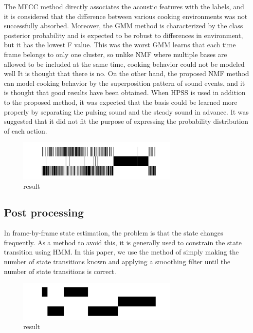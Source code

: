\documentclass[sigchi]{acmart}
\begin{document}
The MFCC method directly associates the acoustic features with the labels, and it is considered that the difference between various cooking environments was not successfully absorbed.
Moreover, the GMM method is characterized by the class posterior probability and is expected to be robust to differences in environment, but it has the lowest F value. This was the worst%
GMM learns that each time frame belongs to only one cluster, so unlike NMF where multiple bases are allowed to be included at the same time, cooking behavior could not be modeled well It is thought that there is no.
On the other hand, the proposed NMF method can model cooking behavior by the superposition pattern of sound events, and it is thought that good results have been obtained.
When HPSS is used in addition to the proposed method, it was expected that the basis could be learned more properly by separating the pulsing sound and the steady sound in advance. It was suggested that it did not fit the purpose of expressing the probability distribution of each action.

\begin{figure}[h]
  \centering
  \includegraphics[width=8cm]{fig/N63_m4.pdf}
  \caption{result}
  \Description{}
  \label{baseine_timeline_result}
\end{figure}

\subsection{Post processing}

In frame-by-frame state estimation, the problem is that the state changes frequently. As a method to avoid this, it is generally used to constrain the state transition using HMM.
In this paper, we use the method of simply making the number of state transitions known and applying a smoothing filter until the number of state transitions is correct.

\begin{figure}[h]
  \centering
  \includegraphics[width=8cm]{fig/N63_m4_smoothed.pdf}
  \caption{result}
  \Description{}
  \label{baseine_timeline_smoothed_result}
\end{figure}
\end{document}
